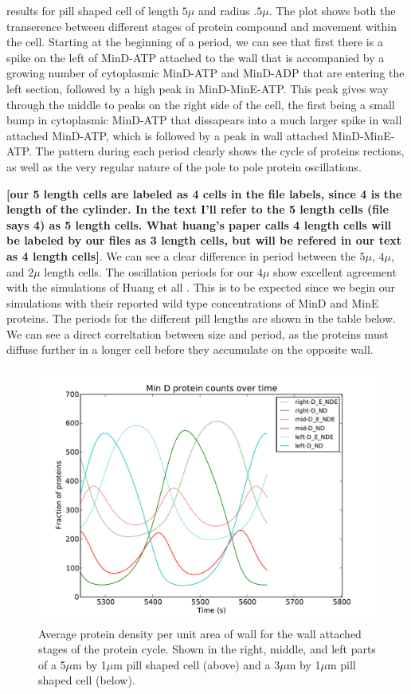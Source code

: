 \documentclass[letterpaper,twocolumn,amsmath,amssymb,pre]{revtex4-1}
\newcommand{\red}[1]{{\bf \color{red} #1}}
\newcommand{\fixme}[1]{\red{[#1]}}
\newcommand\micron{\ensuremath{\mu\text{m}}}
\begin{document}
results for pill shaped cell of length
$5\mu$ and radius $.5\mu$.  The plot shows both the transerence
between different stages of protein compound and movement within the
cell.  Starting at the beginning of a period, we can see that first
there is a spike on the left of MinD-ATP attached to the wall that is
accompanied by a growing number of cytoplasmic MinD-ATP and MinD-ADP
that are entering the left section, followed by a high peak in
MinD-MinE-ATP.  This peak gives way through the middle to peaks on the
right side of the cell, the first being a small bump in cytoplasmic
MinD-ATP that dissapears into a much larger spike in wall attached
MinD-ATP, which is followed by a peak in wall attached MinD-MinE-ATP.
The pattern during each period clearly shows the cycle of proteins
rections, as well as the very regular nature of the pole to pole
protein oscillations.

\fixme{our 5 length cells are labeled as 4 cells in the file labels,
  since 4 is the length of the cylinder. In the text I'll refer to the
  5 length cells (file says 4) as 5 length cells.  What huang's paper
  calls 4 length cells will be labeled by our files as 3 length cells,
  but will be refered in our text as 4 length cells}.  We can see a
clear difference in period between the $5\mu$, $4\mu$, and $2\mu$
length cells.  The oscillation periods for our $4\mu$ show excellent
agreement with the simulations of Huang et all
\cite{huang2003dynamic}.  This is to be expected since we begin our
simulations with their reported wild type concentrations of MinD and
MinE proteins. The periods for the different pill lengths are shown in
the table below.  We can see a direct correltation between size and
period, as the proteins must diffuse further in a longer cell before
they accumulate on the opposite wall.

\begin{figure}
  \includegraphics[width=\columnwidth]{../data/shape-p/plots/ave-plot_D--p-200-50-0-0-1500}
  \caption{Average protein density per unit area of wall for the wall
    attached stages of the protein cycle.  Shown in the right, middle,
    and left parts of a 5$\micron$ by 1$\micron$ pill shaped cell (above)
    and a 3$\micron$ by 1$\micron$ pill shaped cell (below).}
  \label{ave-per-area-plot-pill}
\end{figure}
\end{document}
